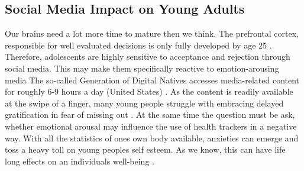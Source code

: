 \subsection{Social Media Impact on Young Adults}
Our brains need a lot more time to mature then we think. The prefrontal cortex, responsible for well evaluated decisions is only fully developed by age 25 \cite{prefrontalCortexDev}. Therefore, adolescents are highly sensitive to acceptance and rejection through social media. This may make them specifically reactive to emotion-arousing media The so-called Generation of Digital Natives accesses media-related content for roughly 6-9 hours a day (United States) \cite{crone2018media}. As the content is readily available at the swipe of a finger, many young people struggle with embracing delayed gratification in fear of missing out \cite{oberst2017negativ}. At the same time the question must be ask, whether emotional arousal may influence the use of health trackers in a negative way. With all the statistics of ones own body available, anxieties can emerge and toss a heavy toll on young peoples self esteem. As we know, this can have life long effects on an individuals well-being \cite{mykletun2006mortality}.

